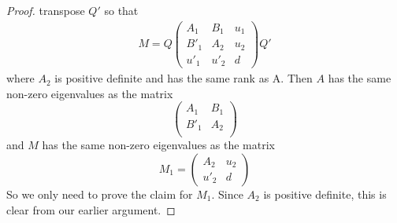 \documentclass{article}
\begin{document}
\begin{proof}
  transpose $Q'$ so that
  \begin{eqnarray*}
    M = Q
    \begin{pmatrix}
      A_1 & B_1 & u_1 \\
      B'_1 & A_2 & u_2 \\
      u'_1 & u'_2 & d
    \end{pmatrix} Q'
  \end{eqnarray*}
  where $A_2$ is positive definite and has the same rank as A. Then
  $A$ has the same non-zero eigenvalues as the matrix
  \[
  \begin{pmatrix}
      A_1 & B_1 \\
      B'_1 & A_2 \\
  \end{pmatrix}
  \]
  and $M$ has the same non-zero eigenvalues as the matrix
  \[
  M_1 = 
  \begin{pmatrix}
      A_2 & u_2 \\
      u'_2 & d
  \end{pmatrix}
  \]
  So we only need to prove the claim for $M_1$. Since $A_2$ is
  positive definite, this is clear from our earlier argument.
\end{proof}


\end{document}
